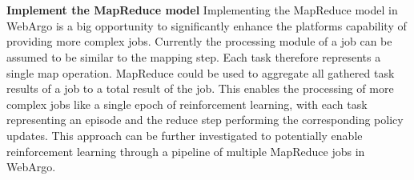 \\~\\
\textbf{Implement the MapReduce model}
Implementing the MapReduce \cite{conclusion:map-reduce} model in WebArgo is a big opportunity to significantly enhance the platforms capability of providing more complex jobs. Currently the processing module of a job can be assumed to be similar to the mapping step. Each task therefore represents a single map operation. MapReduce could be used to aggregate all gathered task results of a job to a total result of the job. This enables the processing of more complex jobs like a single epoch of reinforcement learning, with each task representing an episode and the reduce step performing the corresponding policy updates. This approach can be further investigated to potentially enable reinforcement learning through a pipeline of multiple MapReduce jobs in WebArgo.